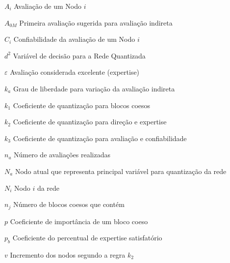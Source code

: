 \begin{simbolos}
  \item[ \(A_i\)] Avaliação de um Nodo \(i\)
  \item[\(A_{0M}\)] Primeira avaliação sugerida para avaliação indireta
  \item[\(C_i\)] Confiabilidade da avaliação de um Nodo \(i\)
  \item[\(d^2\)] Variável de decisão para a Rede Quantizada
  \item[\(\varepsilon\)] Avaliação considerada excelente (expertise)
  \item[\(k_a\)] Grau de liberdade para variação da avaliação indireta
  \item[\(k_1\)] Coeficiente de quantização para blocos coesos
  \item[\(k_2\)] Coeficiente de quantização para direção e expertise
  \item[\(k_3\)] Coeficiente de quantização para avaliação e confiabilidade
  \item[\(n_a\)] Número de avaliações realizadas
  \item[\(N_a\)] Nodo atual que representa principal variável para quantização da rede
  \item[\(N_i\)] Nodo \(i\) da rede
  \item[\(n_j\)] Número de blocos coesos que contém
  \item[\(p\)] Coeficiente de importância de um bloco coeso
  \item[\(p_b\)] Coeficiente do percentual de expertise satisfatório
  \item[\(v\)] Incremento dos nodos segundo a regra \(k_2\) 
\end{simbolos}
